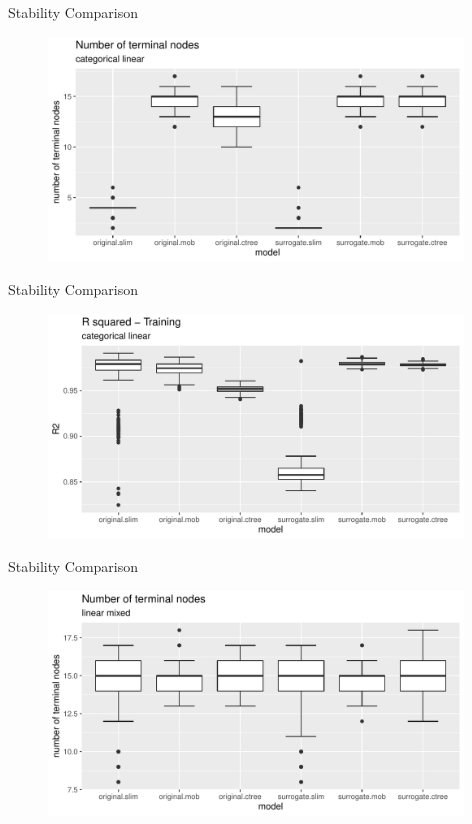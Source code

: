 \documentclass[9pt, xcolor=table]{beamer}
\begin{document}
\begin{frame}{Stability Comparison}
\begin{figure}
    \includegraphics[width=11cm]{Figures/Stability/categorical_linear/nofnodes.pdf}
\end{figure}
\end{frame}

\begin{frame}{Stability Comparison}
\begin{figure}
    \includegraphics[width=11cm]{Figures/Stability/categorical_linear/r2_train.pdf}
\end{figure}
\end{frame}

\begin{frame}{Stability Comparison}
\begin{figure}
    \includegraphics[width=11cm]{Figures/Stability/linear_mixed/nofnodes.pdf}
\end{figure}
\end{frame}
\end{document}
